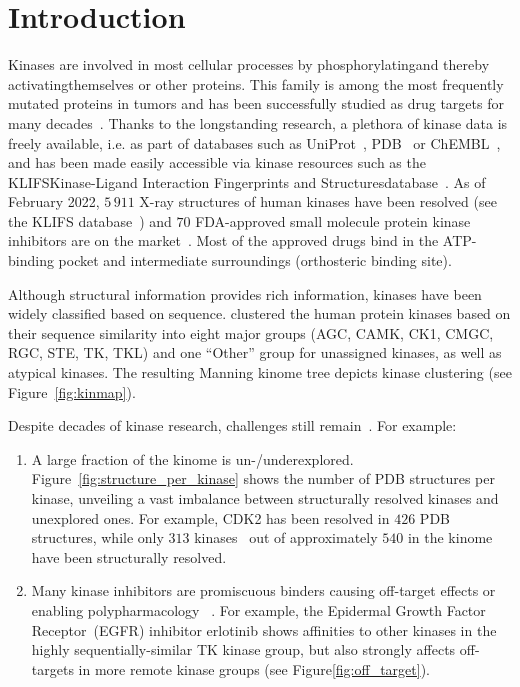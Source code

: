\documentclass[9pt,training]{livecoms}
\begin{document}
\section{Introduction}
Kinases are involved in most cellular processes by phosphorylating\textemdash and thereby activating\textemdash themselves or other proteins. This family is among the most frequently mutated proteins in tumors and has been successfully studied as drug targets for many decades~\cite{Cohen_2021_NatRevDrugDiscov}. Thanks to the longstanding research, a plethora of kinase data is freely available, i.e. as part of databases such as UniProt~\cite{uniprot_consortium_2020_nar}, PDB~\cite{Berman_2000_NAR} or ChEMBL~\cite{Gaulton_2016_nar}, and has been made easily accessible via kinase resources such as the KLIFS\textemdash Kinase-Ligand Interaction Fingerprints and Structures\textemdash database~\cite{Kanev_2020_NAR}. As of February 2022, $5\,911$ X-ray structures of human kinases have been resolved (see the KLIFS database~\cite{klifs_feb_2022}) and $70$ FDA-approved small molecule protein kinase inhibitors are on the market~\cite{FDA_PKI_2022}. Most of the approved drugs bind in the ATP-binding pocket and intermediate surroundings (orthosteric binding site).

Although structural information provides rich information, kinases have been widely classified based on sequence. \citet{Manning_2022_science} clustered the human protein kinases based on their sequence similarity into eight major groups (AGC, CAMK, CK1, CMGC, RGC, STE, TK, TKL) and one “Other” group for unassigned kinases, as well as atypical kinases. The resulting Manning kinome tree depicts kinase clustering (see Figure~\ref{fig:kinmap}).

Despite decades of kinase research, challenges still remain~\cite{Kooistra_2017_AnnualReportsMedicinalChemistry}. For example: \begin{enumerate}
    \item A large fraction of the kinome is un-/underexplored. Figure~\ref{fig:structure_per_kinase} shows the number of PDB structures per kinase, unveiling a vast imbalance between structurally resolved kinases and unexplored ones. For example, CDK2 has been resolved in $426$ PDB structures, while only $313$ kinases~\cite{klifs_feb_2022} out of approximately $540$ in the kinome~\cite{Kooistra_2017_AnnualReportsMedicinalChemistry} have been structurally resolved.
    \item Many kinase inhibitors are promiscuous binders causing off-target effects or enabling polypharmacology ~\cite{Cohen_2021_NatRevDrugDiscov, Morphy_2009_JMedChem}. For example, the Epidermal Growth Factor Receptor~(EGFR) inhibitor erlotinib shows affinities to other kinases in the highly sequentially-similar TK kinase group, but also strongly affects off-targets in more remote kinase groups (see Figure\ref{fig:off_target}).
\end{enumerate}
\end{document}
